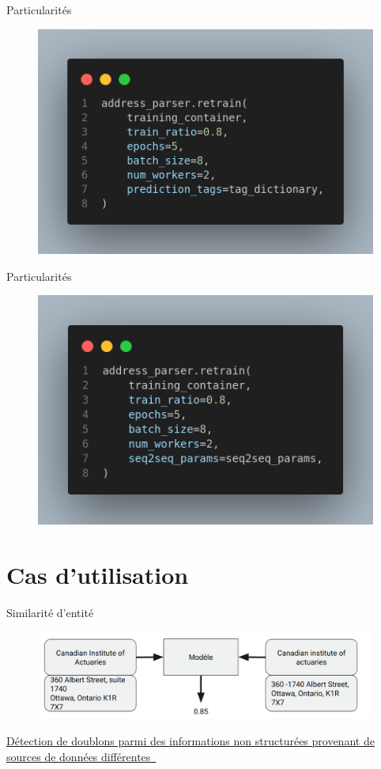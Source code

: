 \documentclass{beamer}
\newcommand{\link}[2]{\href{#1}{#2~{\smaller\faExternalLink*}}}
\begin{document}
	\begin{frame}{Particularités}
		\begin{figure}
			\centering
			\includegraphics[width=0.6\linewidth]{img/new_tags}
		\end{figure}
	\end{frame}
	
	\begin{frame}{Particularités}
		\begin{figure}
			\centering
			\includegraphics[width=0.7\linewidth]{img/new_archi}
		\end{figure}
	\end{frame}
	
	\section{Cas d'utilisation}
	\begin{frame}{Similarité d'entité}
		\begin{figure}
			\centering
			\includegraphics[width=0.9\linewidth]{img/sim}
		\end{figure}
		\link{https://corpus.ulaval.ca/server/api/core/bitstreams/c37706b1-c6e6-4878-8b3d-8a0874bba131/content}{Détection de doublons parmi des informations non structurées provenant de sources de données différentes}
	\end{frame}
	
\end{document}
